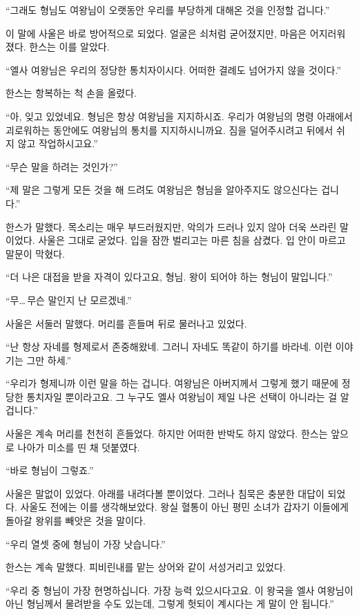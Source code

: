 ``그래도 형님도 여왕님이 오랫동안 우리를 부당하게 대해온 것을 인정할 겁니다.''

이 말에 사울은 바로 방어적으로 되었다. 얼굴은 쇠처럼 굳어졌지만, 마음은 어지러워졌다. 한스는 이를 알았다.

``엘사 여왕님은 우리의 정당한 통치자이시다. 어떠한 결례도 넘어가지 않을 것이다.''

한스는 항복하는 척 손을 올렸다.

``아, 잊고 있었네요. 형님은 항상 여왕님을 지지하시죠. 우리가 여왕님의 명령 아래에서 괴로워하는 동안에도 여왕님의 통치를 지지하시니까요. 짐을 덜어주시려고 뒤에서 쉬지 않고 작업하시고요.''

``무슨 말을 하려는 것인가?''

``제 말은 그렇게 모든 것을 해 드려도 여왕님은 형님을 알아주지도 않으신다는 겁니다.''

한스가 말했다. 목소리는 매우 부드러웠지만, 악의가 드러나 있지 않아 더욱 쓰라린 말이었다. 사울은 그대로 굳었다. 입을 잠깐 벌리고는 마른 침을 삼켰다. 입 안이 마르고 말문이 막혔다.

``더 나은 대접을 받을 자격이 있다고요, 형님. 왕이 되어야 하는 형님이 말입니다.''

``무\ldots\,무슨 말인지 난 모르겠네.''

사울은 서둘러 말했다. 머리를 흔들며 뒤로 물러나고 있었다.

``난 항상 자네를 형제로서 존중해왔네. 그러니 자네도 똑같이 하기를 바라네. 이런 이야기는 그만 하세.''

``우리가 형제니까 이런 말을 하는 겁니다. 여왕님은 아버지께서 그렇게 했기 때문에 정당한 통치자일 뿐이라고요. 그 누구도 엘사 여왕님이 제일 나은 선택이 아니라는 걸 알 겁니다.''

사울은 계속 머리를 천천히 흔들었다. 하지만 어떠한 반박도 하지 않았다. 한스는 앞으로 나아가 미소를 띤 채 덧붙였다.

``바로 형님이 그렇죠.''

사울은 말없이 있었다. 아래를 내려다볼 뿐이었다. 그러나 침묵은 충분한 대답이 되었다. 사울도 전에는 이를 생각해보았다. 왕실 혈통이 아닌 평민 소녀가 갑자기 이들에게 돌아갈 왕위를 빼앗은 것을 말이다.

``우리 열셋 중에 형님이 가장 낫습니다.''

한스는 계속 말했다. 피비린내를 맡는 상어와 같이 서성거리고 있었다.

``우리 중 형님이 가장 현명하십니다. 가장 능력 있으시다고요. 이 왕국을 엘사 여왕님이 아닌 형님께서 물려받을 수도 있는데, 그렇게 헛되이 계시다는 게 말이 안 됩니다.''

